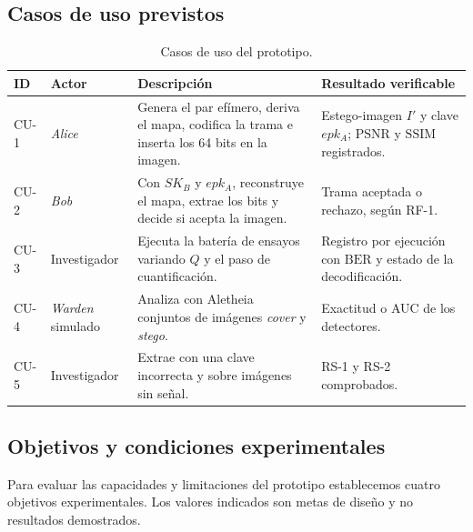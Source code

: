 \documentclass[IB]{TFUOC}%
\begin{document}
\subsection{Casos de uso previstos}
\label{subsec:casos_uso}

\begin{table}[H]
\centering
\scriptsize
\caption{Casos de uso del prototipo.}
\label{tab:casos_uso}
\begin{tabular}{|p{1.1cm}|p{2.2cm}|p{6.4cm}|p{4.9cm}|}
\hline
\rowcolor{uocnavy}
\color{white}\textbf{ID} &
\color{white}\textbf{Actor} &
\color{white}\textbf{Descripción} &
\color{white}\textbf{Resultado verificable} \\
\hline
CU-1 & \textit{Alice} & Genera el par efímero, deriva el mapa, codifica la trama e inserta los 64 bits en la imagen. & Estego-imagen $I'$ y clave $epk_A$; $\mathrm{PSNR}$ y $\mathrm{SSIM}$ registrados. \\
\hline
CU-2 & \textit{Bob} & Con $SK_B$ y $epk_A$, reconstruye el mapa, extrae los bits y decide si acepta la imagen. & Trama aceptada o rechazo, según RF-1. \\
\hline
CU-3 & Investigador & Ejecuta la batería de ensayos variando $Q$ y el paso de cuantificación. & Registro por ejecución con $\mathrm{BER}$ y estado de la decodificación. \\
\hline
CU-4 & \textit{Warden} simulado & Analiza con Aletheia conjuntos de imágenes \textit{cover} y \textit{stego}. & Exactitud o AUC de los detectores. \\
\hline
CU-5 & Investigador & Extrae con una clave incorrecta y sobre imágenes sin señal. & RS-1 y RS-2 comprobados. \\
\hline
\end{tabular}
\end{table}

\subsection{Objetivos y condiciones experimentales}
\label{subsec:objetivos_experimentales}

Para evaluar las capacidades y limitaciones del prototipo establecemos cuatro objetivos experimentales. Los valores indicados son metas de diseño y no resultados demostrados.
\end{document}
